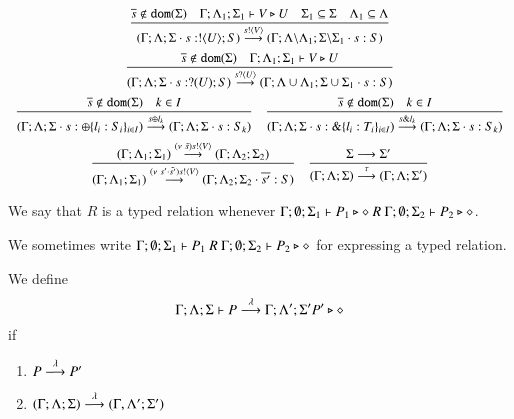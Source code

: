 \[
\begin{array}{c}
	\tree{
		\dual{s} \notin \dom{\Sigma} \quad \Gamma; \Lambda_1; \Sigma_1 \proves V \hastype U \quad \Sigma_1 \subseteq \Sigma \quad \Lambda_1 \subseteq \Lambda
	}{
		(\Gamma; \Lambda; \Sigma \cat s: \btout{U} S) \by{\bactout{s}{V}} (\Gamma; \Lambda\backslash\Lambda_1; \Sigma\backslash\Sigma_1 \cat s: S)
	}
	\\[6mm]
	\tree{
		\dual{s} \notin \dom{\Sigma} \quad  \Gamma; \Lambda_1; \Sigma_1 \proves V \hastype U
	}{
		(\Gamma; \Lambda; \Sigma \cat s: \btinp{U} S) \by{\bactinp{s}{U}} (\Gamma; \Lambda \cup \Lambda_1; \Sigma \cup \Sigma_1 \cat s: S)
	}
	\\[6mm]
	\tree{
		\dual{s} \notin \dom{\Sigma} \quad k \in I
	}{
		(\Gamma; \Lambda; \Sigma \cat s: \btsel{l_i: S_i}_{i \in I}) \by{\bactsel{s}{l_k}} (\Gamma; \Lambda; \Sigma \cat s:S_k)
	}
	\quad
	\tree{
		\dual{s} \notin \dom{\Sigma} \quad k \in I
	}{
		(\Gamma; \Lambda; \Sigma \cat s: \btbra{l_i: T_i}_{i \in I}) \by{\bactbra{s}{l_k}} (\Gamma; \Lambda; \Sigma \cat s:S_k)
	}
	\\[6mm]

	\tree{
		(\Gamma; \Lambda_1; \Sigma_1) \by{\news{\tilde{s}} \bactout{s}{V}} (\Gamma; \Lambda_2; \Sigma_2)
	}{
		(\Gamma; \Lambda_1; \Sigma_1) \by{\news{s' \cat \tilde{s'}} \bactout{s}{V}} (\Gamma; \Lambda_2; \Sigma_2 \cat \dual{s'}: S)
	}
	\quad
	\tree{
		\Sigma \red \Sigma'
	}{
		(\Gamma; \Lambda; \Sigma) \by{\tau} (\Gamma; \Lambda; \Sigma')
	}
\end{array}
\]

\begin{definition}
	We say that $R$ is a typed relation whenever
	$\Gamma; \emptyset; \Sigma_1 \vdash P_1 \triangleright \diamond\ R\ \Gamma; \emptyset; \Sigma_2 \vdash P_2 \triangleright \diamond$.
\end{definition}

We sometimes write $\Gamma; \emptyset; \Sigma_1 \vdash P_1\ R\ \Gamma; \emptyset; \Sigma_2 \vdash P_2 \triangleright \diamond$
for expressing a typed relation.

\begin{definition}
	We define
	\[
		\Gamma; \Lambda; \Sigma \vdash P \stackrel{\lambda}{\longrightarrow} \Gamma; \Lambda'; \Sigma' P' \triangleright \diamond
	\]
	if
	\begin{enumerate}
		\item	$P \stackrel{\lambda}{\longrightarrow} P'$
		\item	$(\Gamma; \Lambda; \Sigma) \stackrel{\lambda}{\longrightarrow} (\Gamma, \Lambda'; \Sigma')$
	\end{enumerate}
\end{definition}

